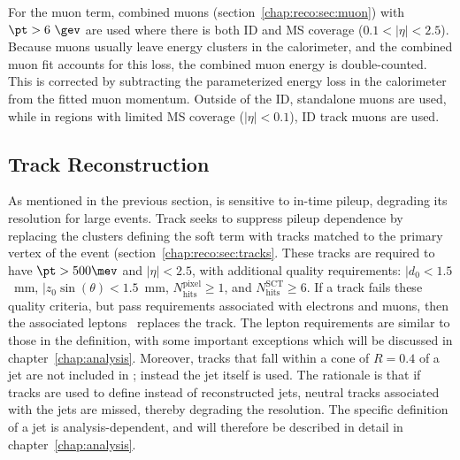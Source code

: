 For the
muon term, combined muons (section~\ref{chap:reco:sec:muon}) with $\pt
> 6~\gev$ are used
where there is both ID and MS coverage ($0.1 < |\eta| < 2.5$). Because
muons usually leave energy clusters in the calorimeter, and the
combined muon fit accounts for this loss, the combined muon energy is
double-counted. This is corrected by subtracting the parameterized energy loss in the
calorimeter from the fitted muon momentum. Outside of the ID,
standalone muons are used, while in regions with limited MS coverage
($|\eta| < 0.1$), ID track muons are used.

\subsection{Track \etmiss Reconstruction}

As mentioned in the previous section, \calomet is sensitive to in-time
pileup, degrading its resolution for large \nvtx events. Track \etmiss
seeks to suppress pileup dependence by replacing the clusters defining
the soft term with tracks matched to the primary vertex of the
event (section~\ref{chap:reco:sec:tracks}. These tracks are required
to have $\pt > 500 \mev$ and $|\eta| < 2.5$, with additional quality
requirements: $|d_0 < 1.5$~mm, $|z_0\sin(\theta) < 1.5$~mm,
$N_{\textrm{hits}}^{\textrm{pixel}} \geq 1$, and
$N_{\textrm{hits}}^{\textrm{SCT}} \geq 6$. If a track fails these
quality criteria, but pass requirements associated with electrons and
muons, then the associated leptons \pt~replaces the track. The lepton
requirements are similar to those in the \calomet definition, with
some important exceptions which will be discussed in
chapter~\ref{chap:analysis}. Moreover, tracks that fall within a cone
of $R=0.4$ of a jet are not included in \etmiss; instead the jet
itself is used. The rationale is that
if tracks are used to define \etmiss instead of reconstructed jets,
neutral tracks associated with the jets are missed, thereby degrading
the \etmiss resolution. The specific definition of a jet is
analysis-dependent, and will therefore be described in detail in
chapter~\ref{chap:analysis}. 
